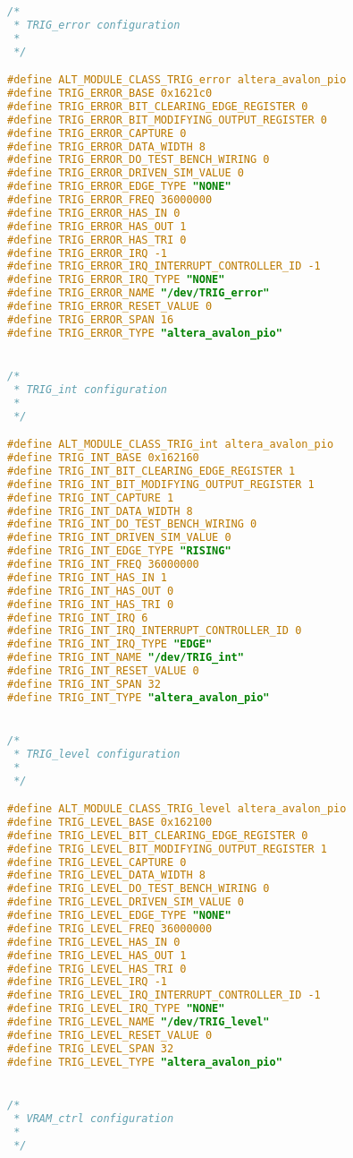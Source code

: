 \begin{lstlisting}[language=C]
/*
 * TRIG_error configuration
 *
 */

#define ALT_MODULE_CLASS_TRIG_error altera_avalon_pio
#define TRIG_ERROR_BASE 0x1621c0
#define TRIG_ERROR_BIT_CLEARING_EDGE_REGISTER 0
#define TRIG_ERROR_BIT_MODIFYING_OUTPUT_REGISTER 0
#define TRIG_ERROR_CAPTURE 0
#define TRIG_ERROR_DATA_WIDTH 8
#define TRIG_ERROR_DO_TEST_BENCH_WIRING 0
#define TRIG_ERROR_DRIVEN_SIM_VALUE 0
#define TRIG_ERROR_EDGE_TYPE "NONE"
#define TRIG_ERROR_FREQ 36000000
#define TRIG_ERROR_HAS_IN 0
#define TRIG_ERROR_HAS_OUT 1
#define TRIG_ERROR_HAS_TRI 0
#define TRIG_ERROR_IRQ -1
#define TRIG_ERROR_IRQ_INTERRUPT_CONTROLLER_ID -1
#define TRIG_ERROR_IRQ_TYPE "NONE"
#define TRIG_ERROR_NAME "/dev/TRIG_error"
#define TRIG_ERROR_RESET_VALUE 0
#define TRIG_ERROR_SPAN 16
#define TRIG_ERROR_TYPE "altera_avalon_pio"


/*
 * TRIG_int configuration
 *
 */

#define ALT_MODULE_CLASS_TRIG_int altera_avalon_pio
#define TRIG_INT_BASE 0x162160
#define TRIG_INT_BIT_CLEARING_EDGE_REGISTER 1
#define TRIG_INT_BIT_MODIFYING_OUTPUT_REGISTER 1
#define TRIG_INT_CAPTURE 1
#define TRIG_INT_DATA_WIDTH 8
#define TRIG_INT_DO_TEST_BENCH_WIRING 0
#define TRIG_INT_DRIVEN_SIM_VALUE 0
#define TRIG_INT_EDGE_TYPE "RISING"
#define TRIG_INT_FREQ 36000000
#define TRIG_INT_HAS_IN 1
#define TRIG_INT_HAS_OUT 0
#define TRIG_INT_HAS_TRI 0
#define TRIG_INT_IRQ 6
#define TRIG_INT_IRQ_INTERRUPT_CONTROLLER_ID 0
#define TRIG_INT_IRQ_TYPE "EDGE"
#define TRIG_INT_NAME "/dev/TRIG_int"
#define TRIG_INT_RESET_VALUE 0
#define TRIG_INT_SPAN 32
#define TRIG_INT_TYPE "altera_avalon_pio"


/*
 * TRIG_level configuration
 *
 */

#define ALT_MODULE_CLASS_TRIG_level altera_avalon_pio
#define TRIG_LEVEL_BASE 0x162100
#define TRIG_LEVEL_BIT_CLEARING_EDGE_REGISTER 0
#define TRIG_LEVEL_BIT_MODIFYING_OUTPUT_REGISTER 1
#define TRIG_LEVEL_CAPTURE 0
#define TRIG_LEVEL_DATA_WIDTH 8
#define TRIG_LEVEL_DO_TEST_BENCH_WIRING 0
#define TRIG_LEVEL_DRIVEN_SIM_VALUE 0
#define TRIG_LEVEL_EDGE_TYPE "NONE"
#define TRIG_LEVEL_FREQ 36000000
#define TRIG_LEVEL_HAS_IN 0
#define TRIG_LEVEL_HAS_OUT 1
#define TRIG_LEVEL_HAS_TRI 0
#define TRIG_LEVEL_IRQ -1
#define TRIG_LEVEL_IRQ_INTERRUPT_CONTROLLER_ID -1
#define TRIG_LEVEL_IRQ_TYPE "NONE"
#define TRIG_LEVEL_NAME "/dev/TRIG_level"
#define TRIG_LEVEL_RESET_VALUE 0
#define TRIG_LEVEL_SPAN 32
#define TRIG_LEVEL_TYPE "altera_avalon_pio"


/*
 * VRAM_ctrl configuration
 *
 */


\end{lstlisting}

